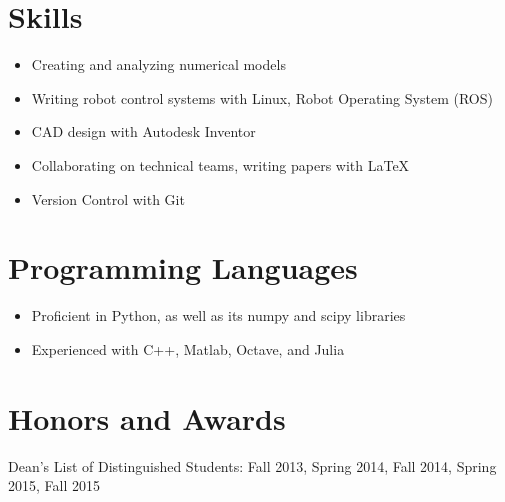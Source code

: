 \documentclass[12pt]{res}
\begin{document}
\begin{resume}
  \vspace{-20pt}
  \section{Skills}
	\vspace{-10pt}
	\noindent
	\begin{itemize}
	\item Creating and analyzing numerical models
	\vspace{-10pt}
	\item Writing robot control systems with Linux, Robot Operating System
		(ROS)	
	\vspace{-10pt}
	\item CAD design with Autodesk Inventor
	\vspace{-10pt}
	\item Collaborating on technical teams, writing papers with \LaTeX
	\vspace{-10pt}
	\item Version Control with Git
	\end{itemize}


   \vspace{-10pt}	
   \section{Programming Languages}
	\noindent
	\begin{itemize}
	\item Proficient in Python, as well as its numpy and scipy libraries
	\vspace{-10pt}
	\item Experienced with C++, Matlab, Octave, and Julia
	\end{itemize}
  \vspace{-15pt}
  \section{Honors and Awards}
	\noindent
    Dean's List of Distinguished Students: Fall 2013, Spring 2014, Fall 2014, Spring 2015, Fall 2015\\

\end{resume}
\end{document}
